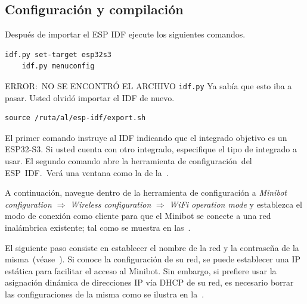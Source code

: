 \documentclass[letterpaper,10.5pt]{article}
\begin{document}
\subsection{Configuración y compilación}
Después de importar el ESP IDF ejecute los siguientes comandos.
\begin{Verbatim}[gobble=1]
	idf.py set-target esp32s3
	idf.py menuconfig
\end{Verbatim}

\begin{yellowbox}{ERROR:~NO SE ENCONTRÓ EL ARCHIVO \texttt{idf.py}}
Ya sabía que esto iba a pasar. Usted olvidó importar el IDF de nuevo.
	\begin{Verbatim}[gobble=2]
		source /ruta/al/esp-idf/export.sh
	\end{Verbatim}
\end{yellowbox}

El primer comando instruye al IDF indicando que el integrado objetivo es un ESP32-S3. Si usted cuenta con otro integrado, especifique el tipo de integrado a usar. El segundo comando abre la herramienta de configuración~del ESP~IDF.~Verá una ventana como la de la~.

A continuación, navegue dentro de la herramienta de configuración a
\emph{Minibot configuration} $\Rightarrow$
\emph{Wireless configuration} $\Rightarrow$
\emph{WiFi operation mode}
y establezca el modo de conexión como cliente para que el Minibot se conecte a una red inalámbrica existente;
tal como se muestra en las~.

El siguiente paso consiste en establecer el nombre de la red y la contraseña de la misma~(véase~).
Si conoce la configuración de su red, se puede establecer una IP estática para facilitar el acceso al Minibot.
Sin embargo, si prefiere usar la asignación dinámica de direcciones IP vía DHCP de su red, es necesario borrar las configuraciones de la misma como se ilustra en la~.
\end{document}
